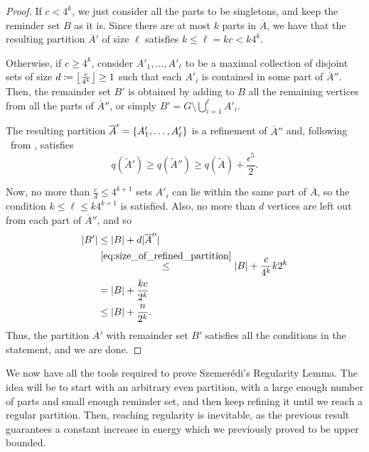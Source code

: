 \begin{lemma}
\begin{proof}
                If $c < 4^k$, we just consider all the parts to be singletons, and keep the reminder set $B$ as it is.
                Since there are at most $k$ parts in $\overline{A}$, we have that the resulting partition $\overline{A}'$
                of size $\ell$ satisfies $k \leq \ell = kc < k 4^k$.

                Otherwise, if $c \geq 4^k$, consider $A'_1, \dots, A'_\ell$ to be a maximal collection of disjoint
                sets of size $d \coloneqq \left\lfloor \frac{c}{4^k} \right\rfloor \geq 1$ such that each $A'_i$ is contained in some part of
                $\overline{A}''$.
                Then, the remainder set $B'$ is obtained by adding to $B$ all the remaining vertices from all the parts
                of $\overline{A}''$, or simply $B' = G \setminus \bigcup_{i=1}^\ell A'_i$.

                The resulting partition $\overline{A}' = \{ A'_1, \dots, A'_\ell \}$ is a refinement of
                $\overline{A}''$ and, following ~from
                , satisfies
                \[
                    q(\widetilde{A}') \geq q(\widetilde{A}'') \geq q(\widetilde{A}) + \frac{\epsilon^5}{2}.
                \]

                Now, no more than $\frac{c}{d} \leq 4^{k+1}$ sets $A'_i$ can lie within the same part of $\overline{A}$,
                so the condition $k \leq \ell \leq k 4^{k+1}$ is satisfied.
                Also, no more than $d$ vertices are left out from each part of $\overline{A}''$, and so
                \begin{align*}
                    |B'|
                        & \leq |B| + d |\overline{A}''| \\
                        & \stackrel{\eqref{eq:size_of_refined_partition}}{\leq}
                            |B| + \frac{c}{4^k} k 2^k \\
                        & = |B| + \frac{kc}{2^k} \\
                        & \leq |B| + \frac{n}{2^k}.
                \end{align*}
                Thus, the partition $\overline{A}'$ with remainder set $B'$ satisfies all the conditions in the statement,
                and we are done.
            \end{proof}
        \end{lemma}

        We now have all the tools required to prove Szemerédi's Regularity Lemma.
        The idea will be to start with an arbitrary even partition, with a large enough number of parts and small
        enough reminder set, and then keep refining it until we reach a regular partition.
        Then, reaching regularity is inevitable, as the previous result guarantees a constant increase in energy
        which we previously proved to be upper bounded.

